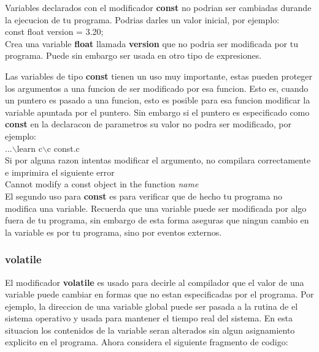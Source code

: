 \documentclass[]{article}
\begin{document}
	Variables declarados con el modificador \textbf{const} no podrian ser cambiadas durande la ejecucion de tu programa. Podrias darles un valor inicial, por ejemplo:\\
	
	const float version = 3.20;\\
	
	Crea una variable \textbf{float} llamada \textbf{version} que no podria ser modificada por tu programa. Puede sin embargo ser usada en otro tipo de expresiones.
	
	Las variables de tipo \textbf{const} tienen un uso  muy importante, estas pueden proteger los argumentos a una funcion de ser modificado por esa funcion. Esto es, cuando un puntero es pasado a una funcion, esto es posible para esa funcion modificar la variable apuntada por el puntero. Sin embargo si el puntero es especificado como \textbf{const} en la declaracon de parametros su valor no podra ser modificado, por ejemplo:\\
	
	...$\backslash$learn c$\backslash$c const.c\\
	
	Si por alguna razon intentas modificar el argumento, no compilara correctamente e imprimira el siguiente error\\
	
	Cannot modify a const object in the function \textit{name}\\
	
	El segundo uso para \textbf{const} es para verificar que de hecho tu programa no modifica una variable. Recuerda que una variable puede ser modificada por algo fuera de tu programa, sin embargo de esta forma aseguras que ningun cambio en la variable es por tu programa, sino por eventos externos.
	
	\subsubsection{volatile}
	
	El modificador \textbf{volatile} es usado para decirle al compilador que el valor de una variable puede cambiar en formas que no estan especificadas por el programa. Por ejemplo, la direccion de una variable global puede ser pasada a la rutina de el sistema operativo y usada para mantener el tiempo real del sistema. En esta situacion los contenidos de la variable seran alterados sin algun asignamiento explicito en el programa. Ahora considera el siguiente fragmento de codigo:\\
	
\end{document}
